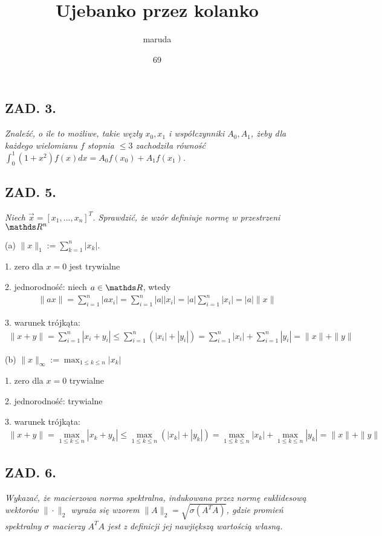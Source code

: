 \documentclass{article}[16pt]
\title{Ujebanko przez kolanko}
\date{69}
\author{maruda}
\begin{document}
\maketitle
\thispagestyle{empty}

\subsection*{ZAD. 3.}
\emph{Znaleźć, o ile to możliwe, takie węzły $x_0,x_1$ i współczynniki $A_0,A_1$, żeby dla każdego wielomianu $f$ stopnia $\leq3$ zachodziła równość $\int_0^1(1+x^2)f(x)dx=A_0f(x_0)+A_1f(x_1)$.}

\subsection*{ZAD. 5.}
\emph{Niech $\vec x=[x_1,...,x_n]^T$. Sprawdzić, że wzór definiuje normę w przestrzeni $\R^n$}
\medskip

{\color{acc}(a) $\|x\|_1:=\sum\limits_{k=1}^n|x_k|$.}
\smallskip

1. zero dla $x=0$ jest trywialne
\smallskip

2. jednorodność: niech $a\in\R$, wtedy
\begin{align*}
    \|ax\|=\sum\limits_{i=1}^n|ax_i|=\sum\limits_{i=1}^n|a||x_i|=|a|\sum\limits_{i=1}^n|x_i|=|a|\|x\|
\end{align*}

3. warunek trójkąta:
\begin{align*}
    \|x+y\|=\sum\limits_{i=1}^n|x_i+y_i|\leq\sum\limits_{i=1}^n(|x_i|+|y_i|)=\sum\limits_{i=1}^n|x_i|+\sum\limits_{i=1}^n|y_i|=\|x\|+\|y\|
\end{align*}
\medskip

{\color{acc}(b) $\|x\|_\infty:=\max_{1\leq k\leq n}|x_k|$}
\smallskip

1. zero dla $x=0$ trywialne
\smallskip

2. jednorodność: trywialne
\smallskip

3. warunek trójkąta:
\begin{align*}
    \|x+y\|=\max_{1\leq k\leq n}|x_k+y_k|\leq \max_{1\leq k\leq n}(|x_k|+|y_k|)=\max_{1\leq k\leq n}|x_k|+\max_{1\leq k\leq n}|y_k|=\|x\|+\|y\|
\end{align*}

\subsection*{ZAD. 6.}
\emph{Wykazać, że macierzowa norma spektralna, indukowana przez normę euklidesową wektorów $\|\cdot\|_2$ wyraża się wzorem $\|A\|_2=\sqrt{\sigma(A^TA)}$, gdzie promień spektralny $\sigma$ macierzy $A^TA$ jest z definicji jej nawjiększą wartością własną.}
\medskip
\end{document}
